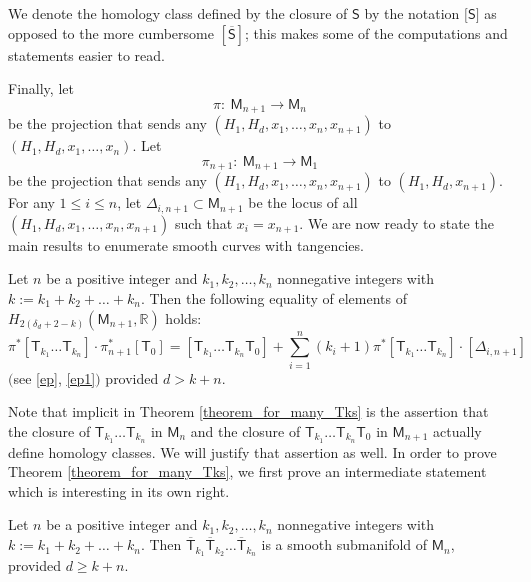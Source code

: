 We denote the homology class defined by the closure of $\mathsf{S}$
by the notation $\big[\mathsf{S}\big]$ as opposed to the more cumbersome $[\overline{\mathsf{S}}]$; this makes
some of the computations and statements easier to read.

Finally, let
\begin{equation}\label{ep}
\pi \colon\ \mathsf{M}_{n+1} \longrightarrow \mathsf{M}_n
\end{equation}
be the projection that sends
any $(H_1, H_d, x_1, \dots, x_{n}, x_{n+1})$ to $(H_1, H_d, x_1, \dots, x_{n})$. Let
\begin{equation}\label{ep1}
\pi_{n+1} \colon\  \mathsf{M}_{n+1} \longrightarrow \mathsf{M}_1
\end{equation}
be the projection that sends any $(H_1, H_d, x_1, \dots, x_{n}, x_{n+1})$ to
$(H_1, H_d, x_{n+1})$. For any $1 \leq i \leq n$, let
$
\Delta_{i, {n+1}}  \subset  \mathsf{M}_{n+1}
$
be the locus of all $(H_1, H_d, x_1, \dots, x_{n}, x_{n+1})$ such that $x_i = x_{n+1}$.
We are now ready to state the main results to enumerate smooth curves with tangencies.

\begin{thm}\label{theorem_for_many_Tks}
Let $n$ be a positive integer and $k_1, k_2,\dots, k_{n}$ nonnegative integers
with
$
k :=  k_1+k_2+\dots +k_n$.
Then the following equality of elements of $H_{2(\delta_d+2- k)}(\mathsf{M}_{n+1}, {\mathbb R})$ holds:
\begin{equation}\label{many_Tks}
\pi^{\ast}[\mathsf{T}_{k_1}\dots \mathsf{T}_{k_n}]\cdot
\pi_{n+1}^{\ast}[\mathsf{T}_0] =
[\mathsf{T}_{k_1}\dots \mathsf{T}_{k_n} \mathsf{T}_{0}]
 + \sum_{i=1}^{n}(k_i+1) \pi^{\ast}[\mathsf{T}_{k_1}\dots \mathsf{T}_{k_n}] \cdot [\Delta_{i, {n+1}}]
\end{equation}
$($see \eqref{ep}, \eqref{ep1}$)$ provided $d > k+n$.
\end{thm}

Note that implicit in Theorem \ref{theorem_for_many_Tks} is the assertion that
the closure of $\mathsf{T}_{k_1}\dots \mathsf{T}_{k_n}$ in
$\mathsf{M}_n$ and the closure of
$\mathsf{T}_{k_1}\dots \mathsf{T}_{k_n} \mathsf{T}_{0}$ in $\mathsf{M}_{n+1}$
actually define homology classes. We will justify that assertion as well.
In order to prove Theorem \ref{theorem_for_many_Tks}, we first prove an intermediate statement
which is interesting in its own right.
\begin{prp}
\label{prp_smth_mfld}
Let $n$ be a positive integer and $k_1, k_2,\dots, k_{n}$ nonnegative integers
with
$ k :=  k_1+k_2+\dots +k_n$.
Then $\overline{\mathsf{T}}_{k_1} \overline{\mathsf{T}}_{k_2}\dots \overline{\mathsf{T}}_{k_n}$
is a smooth submanifold of $\mathsf{M}_{n}$, provided
$d \geq k+n$.
\end{prp}

